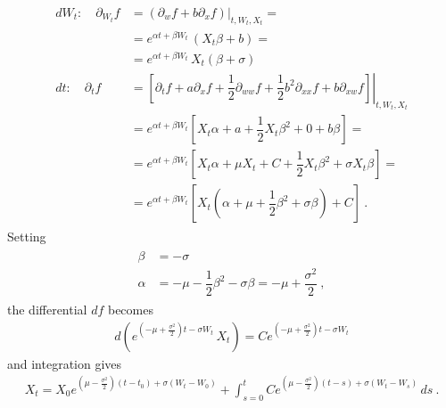 \documentclass[letterpaper,10pt,english]{jupyterBook}
\begin{document}
\begin{equation*}
\begin{split}\begin{aligned}
  dW_t: \quad  \partial_{W_t} f 
  & = \left.\left( \partial_w f + b \partial_x f \right)\right|_{t,W_t,X_t} = \\
  & = e^{\alpha t + \beta W_t} \, \left( X_t \beta + b \right) = \\
  & = e^{\alpha t + \beta W_t} \, X_t \left( \beta + \sigma \right) \\
  dt  : \quad  \partial_{  t} f  \quad 
  & = \left.\left[ \partial_t f + a \partial_x f + \dfrac{1}{2} \partial_{ww} f + \dfrac{1}{2} b^2 \partial_{xx} f + b \partial_{xw} f \right]\right|_{t,W_t,X_t} \\
  & = e^{\alpha t + \beta W_t} \left[ X_t \alpha + a + \dfrac{1}{2} X_t \beta^2 + 0 + b \beta \right] = \\
  & = e^{\alpha t + \beta W_t} \left[ X_t \alpha + \mu X_t + C + \dfrac{1}{2} X_t \beta^2 + \sigma X_t \beta \right] = \\
  & = e^{\alpha t + \beta W_t} \left[ X_t \left( \alpha + \mu + \dfrac{1}{2} \beta^2 + \sigma \beta \right) + C \right] \ .
\end{aligned}\end{split}
\end{equation*}
\sphinxAtStartPar
Setting
\begin{equation*}
\begin{split}\begin{aligned}
  \beta  & = - \sigma \\ 
  \alpha & = - \mu - \dfrac{1}{2} \beta^2 - \sigma \beta = - \mu + \dfrac{\sigma^2}{2} \ , 
\end{aligned}\end{split}
\end{equation*}
\sphinxAtStartPar
the differential \(d f\) becomes
\begin{equation*}
\begin{split}d\left( e^{\left( -\mu + \frac{\sigma^2}{2} \right) t - \sigma W_t} \, X_t \right) = C e^{\left( -\mu + \frac{\sigma^2}{2} \right) t - \sigma W_t}\end{split}
\end{equation*}
\sphinxAtStartPar
and integration gives
\begin{equation*}
\begin{split}X_t = X_0 e^{\left( \mu - \frac{\sigma^2}{2} \right) (t-t_0) + \sigma ( W_t - W_0)} + \int_{s=0}^{t} C e^{\left( \mu - \frac{\sigma^2}{2} \right) (t-s) + \sigma ( W_t - W_s)} \, ds \ .\end{split}
\end{equation*}
\sphinxstepscope
\end{document}
